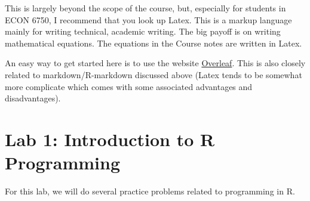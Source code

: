 \documentclass[
  letterpaper,
  DIV=11,
  numbers=noendperiod]{scrreprt}
\begin{document}
This is largely beyond the scope of the course, but, especially for
students in ECON 6750, I recommend that you look up Latex. This is a
markup language mainly for writing technical, academic writing. The big
payoff is on writing mathematical equations. The equations in the Course
notes are written in Latex.

An easy way to get started here is to use the website
\href{http://www.overleaf.com}{Overleaf}. This is also closely related
to markdown/R-markdown discussed above (Latex tends to be somewhat more
complicate which comes with some associated advantages and
disadvantages).

\section{Lab 1: Introduction to R
Programming}\label{lab-1-introduction-to-r-programming}

For this lab, we will do several practice problems related to
programming in R.
\end{document}
